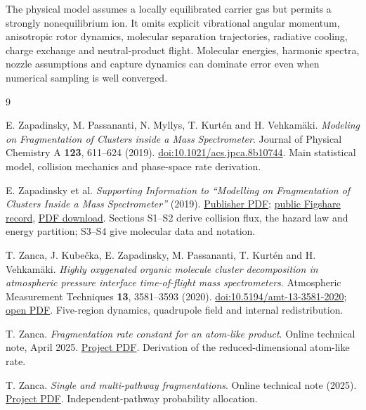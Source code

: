 \documentclass[10pt,a4paper]{article}
\begin{document}
The physical model assumes a locally equilibrated carrier gas but permits a
strongly nonequilibrium ion. It omits explicit vibrational angular momentum,
anisotropic rotor dynamics, molecular separation trajectories, radiative
cooling, charge exchange and neutral-product flight. Molecular energies,
harmonic spectra, nozzle assumptions and capture dynamics can dominate error
even when numerical sampling is well converged.

\clearpage
\begin{thebibliography}{9}
\raggedright
{}
E. Zapadinsky, M. Passananti, N. Myllys, T. Kurt\'en and H. Vehkam\"aki.
\emph{Modeling on Fragmentation of Clusters inside a Mass Spectrometer}.
Journal of Physical Chemistry A \textbf{123}, 611--624 (2019).
\href{https://doi.org/10.1021/acs.jpca.8b10744}{doi:10.1021/acs.jpca.8b10744}.
Main statistical model, collision mechanics and phase-space rate derivation.

E. Zapadinsky et al.
\emph{Supporting Information to ``Modelling on Fragmentation of Clusters
Inside a Mass Spectrometer''} (2019).
\href{https://pubs.acs.org/doi/suppl/10.1021/acs.jpca.8b10744/suppl_file/jp8b10744_si_001.pdf}{Publisher PDF};
\href{https://acs.figshare.com/articles/journal_contribution/7539440}{public Figshare record},
\href{https://ndownloader.figshare.com/files/14016086}{PDF download}.
Sections S1--S2 derive collision flux, the hazard law and energy partition;
S3--S4 give molecular data and notation.

T. Zanca, J. Kube\v cka, E. Zapadinsky, M. Passananti, T. Kurt\'en and
H. Vehkam\"aki.
\emph{Highly oxygenated organic molecule cluster decomposition in atmospheric
pressure interface time-of-flight mass spectrometers}.
Atmospheric Measurement Techniques \textbf{13}, 3581--3593 (2020).
\href{https://doi.org/10.5194/amt-13-3581-2020}{doi:10.5194/amt-13-3581-2020};
\href{https://amt.copernicus.org/articles/13/3581/2020/amt-13-3581-2020.pdf}{open PDF}.
Five-region dynamics, quadrupole field and internal redistribution.

T. Zanca. \emph{Fragmentation rate constant for an atom-like product}.
Online technical note, April 2025.
\href{https://vilmalab.github.io/apitofsim/atom-like_product.pdf}{Project PDF}.
Derivation of the reduced-dimensional atom-like rate.

T. Zanca. \emph{Single and multi-pathway fragmentations}.
Online technical note (2025).
\href{https://vilmalab.github.io/apitofsim/single-and-multi-pathway-fragmentations.pdf}{Project PDF}.
Independent-pathway probability allocation.


\end{thebibliography}
\end{document}
